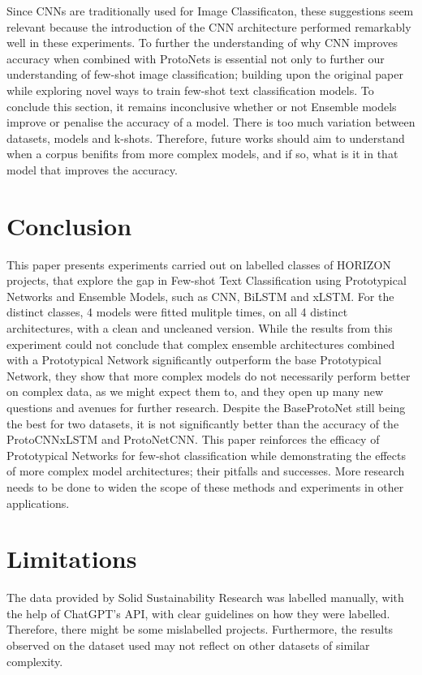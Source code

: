 \documentclass{article}
\begin{document}
Since CNNs are traditionally used for Image Classificaton, these suggestions seem relevant because the introduction of the CNN architecture performed remarkably well in these experiments. To further the understanding of why CNN improves accuracy when combined with ProtoNets is essential not only to further our understanding of
 few-shot image classification; building upon the original paper while exploring novel ways to train few-shot text classification models. 
To conclude this section, it remains inconclusive whether or not Ensemble models improve or penalise the accuracy of a model. There is too much variation between datasets, models and k-shots. Therefore, future works should aim to understand when a corpus benifits from more complex models, and if so, what is it in that model that improves the accuracy. 

\section{Conclusion}

This paper presents experiments carried out on labelled classes of HORIZON projects, that explore the gap in Few-shot Text Classification using Prototypical Networks and Ensemble Models, such as CNN, BiLSTM and xLSTM.
For the distinct classes, 4 models were fitted mulitple times, on all 4 distinct architectures, with a clean and uncleaned version.
While the results from this experiment could not conclude that complex ensemble architectures combined with a Prototypical Network significantly outperform the base Prototypical Network, they show that more complex models do not necessarily perform better on complex data, as we might expect them to, and they open up many new questions and avenues for further research.
Despite the BaseProtoNet still being the best for two datasets, it is not significantly better than the accuracy of the ProtoCNNxLSTM and ProtoNetCNN.
This paper reinforces the efficacy of Prototypical Networks for few-shot classification while demonstrating the effects of more complex model architectures; their pitfalls and successes.
More research needs to be done to widen the scope of these methods and experiments in other applications.

\section{Limitations}

The data provided by Solid Sustainability Research was labelled manually, with the help of ChatGPT's API, with clear guidelines on how they were labelled. \cite{pereira2025classifying}
Therefore, there might be some mislabelled projects. Furthermore, the results observed on the dataset used may not reflect on other datasets of similar complexity.
\end{document}
